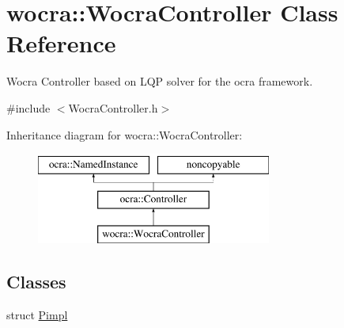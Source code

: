 \hypertarget{classwocra_1_1WocraController}{}\section{wocra\+:\+:Wocra\+Controller Class Reference}
\label{classwocra_1_1WocraController}


Wocra Controller based on L\+QP solver for the ocra framework.  




{\ttfamily \#include $<$Wocra\+Controller.\+h$>$}

Inheritance diagram for wocra\+:\+:Wocra\+Controller\+:\begin{figure}[H]
\begin{center}
\leavevmode
\includegraphics[height=3.000000cm]{db/d14/classwocra_1_1WocraController}
\end{center}
\end{figure}
\subsection*{Classes}
\begin{DoxyCompactItemize}
\item 
struct \hyperlink{structwocra_1_1WocraController_1_1Pimpl}{Pimpl}
\end{DoxyCompactItemize}
